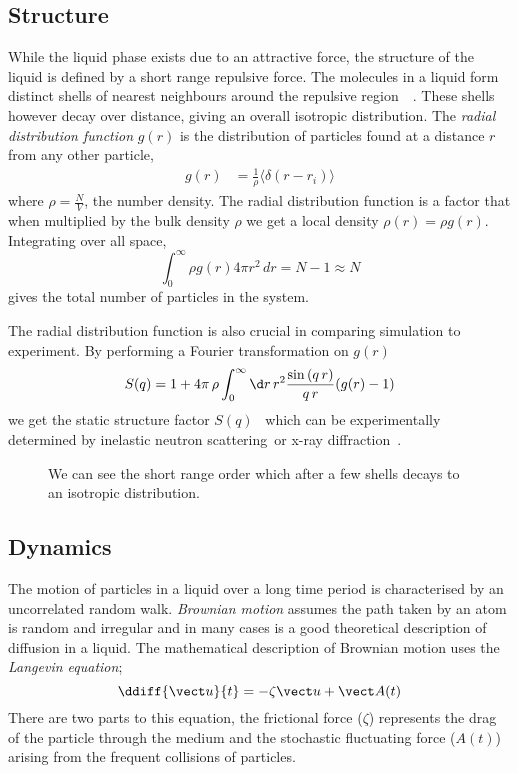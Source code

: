 \subsection{Structure}
While the liquid phase exists due to an attractive force, the structure of the liquid is defined by a short range repulsive force. The molecules in a liquid form distinct shells of nearest neighbours around the repulsive region~~\cite{barrat:03}. These shells however decay over distance, giving an overall isotropic distribution. The \emph{radial distribution function} $g(r)$ is the distribution of particles found at a distance $r$ from any other particle,
\begin{align}
    g(r) &= \frac{1}{\rho} \langle \delta(r - r_i) \rangle
\end{align}
where $\rho = \frac{N}{V}$, the number density. The radial distribution function is a factor that when multiplied by the bulk density $\rho$ we get a local density $\rho(r) = \rho g(r)$. Integrating over all space,
\begin{equation}
    \int_0^\infty \rho g(r) 4 \pi r^2\,dr = N-1 \approx N
\end{equation}
gives the total number of particles in the system.

The radial distribution function is also crucial in comparing simulation to experiment. By performing a Fourier transformation on $g(r)$
\begin{equation}
    S(q) = 1 + 4\pi\,\rho \int^\infty_0\d r\,r^2 \frac{\sin{(q\,r)}}{q\,r} (g(r)-1)
\end{equation}
we get the static structure factor $S(q)$~\cite{allen:87,hansen:86} which can be experimentally determined by inelastic neutron scattering~\tocite or x-ray diffraction~\tocite.

\begin{figure}
    \label{fig:radial distribution}
    \caption{We can see the short range order which after a few shells decays to an isotropic distribution.}
\end{figure}

\subsection{Dynamics}

The motion of particles in a liquid over a long time period is characterised by an uncorrelated random walk. \emph{Brownian motion} assumes the path taken by an atom is random and irregular and in many cases is a good theoretical description of diffusion in a liquid. The mathematical description of Brownian motion uses the \emph{Langevin equation};
\begin{equation}
    \ddiff{\vect u}{t} = - \zeta \vect u + \vect A(t)
    \label{eq:langevin}
\end{equation}
There are two parts to this equation, the frictional force ($\zeta$) represents the drag of the particle through the medium and the stochastic fluctuating force ($A(t)$) arising from the frequent collisions of particles.

